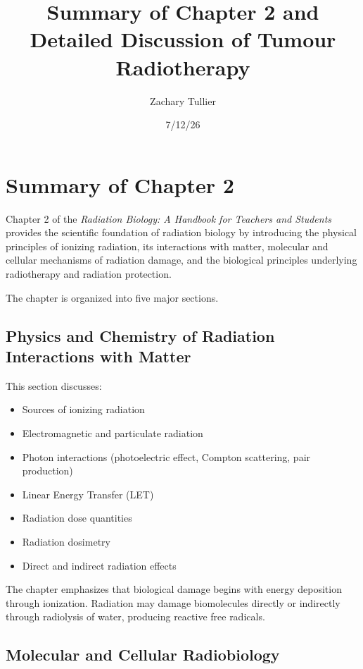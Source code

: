 \documentclass[12pt]{article}
\title{Summary of Chapter 2 and Detailed Discussion of Tumour Radiotherapy}
\author{Zachary Tullier}
\date{7/12/26}
\begin{document}
\maketitle

\tableofcontents

\newpage

\section{Summary of Chapter 2}

Chapter 2 of the \textit{Radiation Biology: A Handbook for Teachers and Students} provides the scientific foundation of radiation biology by introducing the physical principles of ionizing radiation, its interactions with matter, molecular and cellular mechanisms of radiation damage, and the biological principles underlying radiotherapy and radiation protection.

The chapter is organized into five major sections.

\subsection{Physics and Chemistry of Radiation Interactions with Matter}

This section discusses:

\begin{itemize}
\item Sources of ionizing radiation
\item Electromagnetic and particulate radiation
\item Photon interactions (photoelectric effect, Compton scattering, pair production)
\item Linear Energy Transfer (LET)
\item Radiation dose quantities
\item Radiation dosimetry
\item Direct and indirect radiation effects
\end{itemize}

The chapter emphasizes that biological damage begins with energy deposition through ionization. Radiation may damage biomolecules directly or indirectly through radiolysis of water, producing reactive free radicals.

\subsection{Molecular and Cellular Radiobiology}
\end{document}
